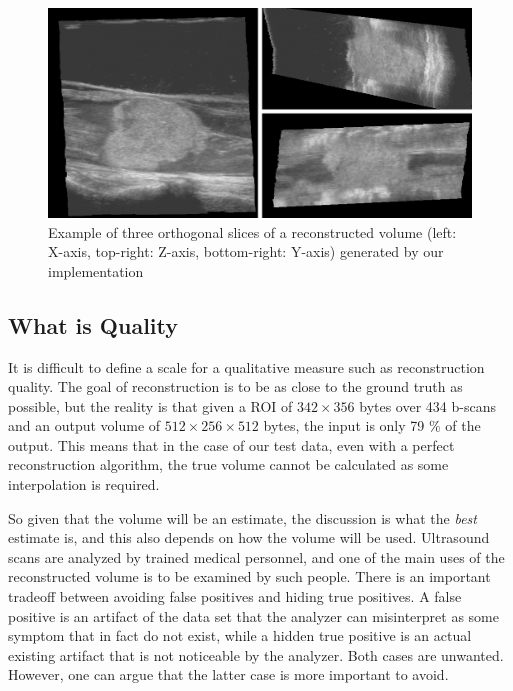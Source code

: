 	\begin{figure}[h]
	\centering
	\includegraphics[width=\textwidth]{graphics/example_volume.png}
	\caption[Example volume]{Example of three orthogonal slices of a reconstructed volume (left: X-axis, top-right: Z-axis, bottom-right: Y-axis) generated by our implementation}
	\label{fig:example_volume}
	\end{figure}

\subsection{What is Quality}

	It is difficult to define a scale for a qualitative measure such as reconstruction quality. The goal of reconstruction is to be as close to the ground truth as possible, but the reality is that given a ROI of $342 \times 356$ bytes over 434 b-scans and an output volume of $512 \times 256 \times 512$ bytes, the input is only 79 \% of the output. This means that in the case of our test data, even with a perfect reconstruction algorithm, the true volume cannot be calculated as some interpolation is required.
	
	So given that the volume will be an estimate, the discussion is what the \emph{best} estimate is, and this also depends on how the volume will be used. Ultrasound scans are analyzed by trained medical personnel, and one of the main uses of the reconstructed volume is to be examined by such people. There is an important tradeoff between avoiding false positives and hiding true positives. A false positive is an artifact of the data set that the analyzer can misinterpret as some symptom that in fact do not exist, while a hidden true positive is an actual existing artifact that is not noticeable by the analyzer. Both cases are unwanted. However, one can argue that the latter case is more important to avoid.
	
